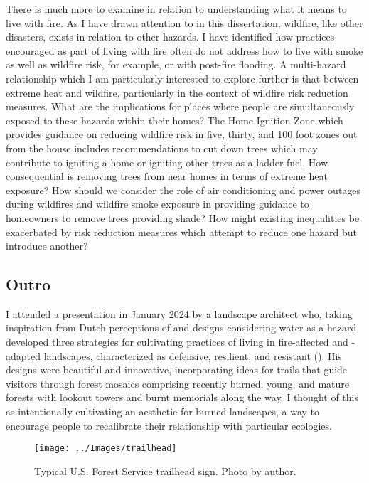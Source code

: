 \documentclass[
]{article}
\begin{document}
There is much more to examine in relation to understanding what it means to live with fire. As I have drawn attention to in this dissertation, wildfire, like other disasters, exists in relation to other hazards. I have identified how practices encouraged as part of living with fire often do not address how to live with smoke as well as wildfire risk, for example, or with post-fire flooding. A multi-hazard relationship which I am particularly interested to explore further is that between extreme heat and wildfire, particularly in the context of wildfire risk reduction measures. What are the implications for places where people are simultaneously exposed to these hazards within their homes? The Home Ignition Zone which provides guidance on reducing wildfire risk in five, thirty, and 100 foot zones out from the house includes recommendations to cut down trees which may contribute to igniting a home or igniting other trees as a ladder fuel. How consequential is removing trees from near homes in terms of extreme heat exposure? How should we consider the role of air conditioning and power outages during wildfires and wildfire smoke exposure in providing guidance to homeowners to remove trees providing shade? How might existing inequalities be exacerbated by risk reduction measures which attempt to reduce one hazard but introduce another?

\subsection{Outro}\label{outro}

I attended a presentation in January 2024 by a landscape architect who, taking inspiration from Dutch perceptions of and designs considering water as a hazard, developed three strategies for cultivating practices of living in fire-affected and -adapted landscapes, characterized as defensive, resilient, and resistant (). His designs were beautiful and innovative, incorporating ideas for trails that guide visitors through forest mosaics comprising recently burned, young, and mature forests with lookout towers and burnt memorials along the way. I thought of this as intentionally cultivating an aesthetic for burned landscapes, a way to encourage people to recalibrate their relationship with particular ecologies.

\begin{figure}
\texttt{[image: ../Images/trailhead]} \caption[Roaring Creek Trailhead]{Typical U.S. Forest Service trailhead sign. Photo by author.}\label{fig:figureTitle17}
\end{figure}
\end{document}
